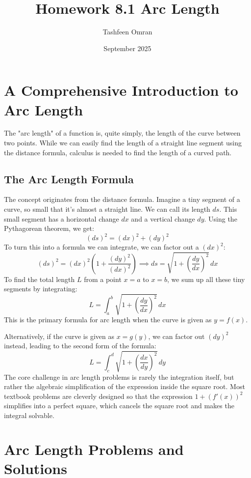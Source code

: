 \documentclass{article}
\title{Homework 8.1 Arc Length}
\author{Tashfeen Omran}
\date{September 2025}
\begin{document}
\maketitle

\section{A Comprehensive Introduction to Arc Length}

The "arc length" of a function is, quite simply, the length of the curve between two points. While we can easily find the length of a straight line segment using the distance formula, calculus is needed to find the length of a curved path.

\subsection*{The Arc Length Formula}
The concept originates from the distance formula. Imagine a tiny segment of a curve, so small that it's almost a straight line. We can call its length $ ds $. This small segment has a horizontal change $ dx $ and a vertical change $ dy $. Using the Pythagorean theorem, we get:
\[ (ds)^2 = (dx)^2 + (dy)^2 \]
To turn this into a formula we can integrate, we can factor out a $ (dx)^2 $:
\[ (ds)^2 = (dx)^2 \left( 1 + \frac{(dy)^2}{(dx)^2} \right) \implies ds = \sqrt{1 + \left(\frac{dy}{dx}\right)^2} \,dx \]
To find the total length $L$ from a point $x=a$ to $x=b$, we sum up all these tiny segments by integrating:
\[ L = \int_{a}^{b} \sqrt{1 + \left(\frac{dy}{dx}\right)^2} \,dx \]
This is the primary formula for arc length when the curve is given as $ y = f(x) $.

Alternatively, if the curve is given as $ x = g(y) $, we can factor out $ (dy)^2 $ instead, leading to the second form of the formula:
\[ L = \int_{c}^{d} \sqrt{1 + \left(\frac{dx}{dy}\right)^2} \,dy \]
The core challenge in arc length problems is rarely the integration itself, but rather the algebraic simplification of the expression inside the square root. Most textbook problems are cleverly designed so that the expression $ 1 + (f'(x))^2 $ simplifies into a perfect square, which cancels the square root and makes the integral solvable.

\section{Arc Length Problems and Solutions}

\end{document}
